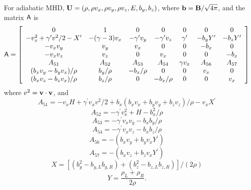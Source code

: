 For adiabatic MHD, ${\bf U} = (\rho, \rho v_{x}, \rho v_{y},
\rho v_{z}, E, b_{y}, b_{z})$, where ${\bf b} = {\bf B}/\sqrt{4\pi}$,
and the matrix ${\sf A}$ is
\begin{equation}
{\sf A} = \left[ \begin{array}{ccccccc}
0 & 1 & 0 & 0 & 0 & 0 & 0 \\
-v_{x}^{2} + \gamma^{\prime}v^{2}/2 - X^{\prime} & -(\gamma-3)v_{x} & -\gamma^{\prime}v_{y} & -\gamma^{\prime}v_{z} & \gamma^{\prime} & -b_{y}Y^{\prime} & -b_{z}Y^{\prime} \\
- v_{x} v_{y} & v_{y} & v_{x} & 0 & 0 & -b_{x} & 0 \\
- v_{x} v_{z} & v_{z} & 0 & v_{x} & 0 & 0 & -b_{x} \\
A_{51} & A_{52} & A_{53} & A_{54} & \gamma v_{x} & A_{56} & A_{57} \\
(b_{x}v_{y} - b_{y}v_{x})/\rho & b_{y}/\rho & -b_{x}/\rho & 0 & 0 & v_{x} & 0 \\
(b_{x}v_{z} - b_{z}v_{x})/\rho & b_{z}/\rho & 0 & -b_{x}/\rho & 0 & 0 & v_{x}
\end{array} \right]
\end{equation}
where $v^{2} = {\bf v}\cdot{\bf v}$, and
\begin{equation}
A_{51} = -v_{x}H + \gamma^{\prime}v_{x}v^{2}/2 + b_{x}(b_{x}v_{x} + b_{y}v_{y}
+ b_{z}v_{z})/\rho - v_{x}X^{\prime}
\end{equation}
\begin{equation}
A_{52} = -\gamma^{\prime}v_{x}^{2} + H - b_{x}^{2}/\rho
\end{equation}
\begin{equation}
A_{53} = -\gamma^{\prime}v_{x}v_{y} - b_{x}b_{y}/\rho
\end{equation}
\begin{equation}
A_{54} = -\gamma^{\prime}v_{x}v_{z} - b_{x}b_{z}/\rho
\end{equation}
\begin{equation}
A_{56} = -(b_{x}v_{y} + b_{y}v_{x}Y^{\prime})
\end{equation}
\begin{equation}
A_{57} = -(b_{x}v_{z} + b_{z}v_{x}Y^{\prime}) 
\end{equation}
\begin{equation}
X=\left[(b_{y}^2-b_{y,L}b_{y,R})+(b_{z}^2-b_{z,L}b_{z,R})\right]/(2\rho)
\end{equation}
\begin{equation}
Y = \frac{\rho_{L} + \rho_{R}}{2\rho}.
\end{equation}
